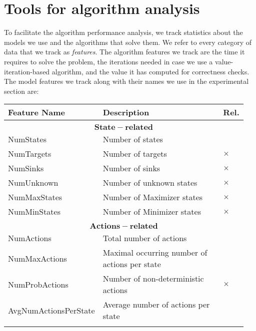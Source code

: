 \chapter{Tools for algorithm analysis} \label{ch:analysis}

To facilitate the algorithm performance analysis, we track statistics about the models we use and the algorithms that solve them. 
We refer to every category of data that we track as \emph{features}.
The algorithm features we track are the time it requires to solve the problem, the iterations needed in case we use a value-iteration-based algorithm, 
and the value it has computed for correctness checks.
The model features we track along with their names we use in the experimental section are:
    \begin{longtable}{| p{0.3\linewidth} | p{0.6\linewidth} | p{0.05\linewidth} |}
        \hline
        Feature Name & Description & Rel. \\\hline\multicolumn{3}{c}{}\\[-0.5em]\hline
        \endhead
        \multicolumn{3}{|c|}{$\mathbf{State-related}$} \\\hline
        NumStates & Number of states & \\
        NumTargets & Number of targets & $\times$  \\
        NumSinks & Number of sinks & $\times$ \\
        NumUnknown & Number of unknown states & $\times$ \\
        NumMaxStates & Number of Maximizer states & $\times$ \\
        NumMinStates & Number of Minimizer states & $\times$ \\\hline\multicolumn{3}{c}{}\\[-0.5em]\hline

        \multicolumn{3}{|c|}{$\mathbf{Actions-related}$} \\\hline
        NumActions & Total number of actions & \\
        NumMaxActions & Maximal occurring number of actions per state &  \\
        NumProbActions & Number of non-deterministic actions & $\times$ \\
        AvgNumActionsPerState & Average number of actions per state & \\\hline\multicolumn{3}{c}{}\\[-0.5em]\hline


\end{longtable}
